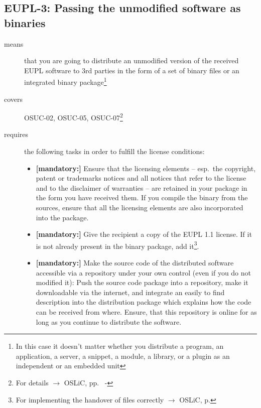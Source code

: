 \subsection{EUPL-3: Passing the unmodified software as binaries} 

\begin{description}
\item[means] that you are going to distribute an unmodified version of the
received EUPL software to 3rd parties in the form of a set of binary files or an
integrated bi\-na\-ry package\footnote{In this case it doesn't matter
whether you  distribute a program, an application, a server, a snippet, a
module, a library, or a plugin as an independent or an embedded unit}

\item[covers] OSUC-02, OSUC-05, OSUC-07\footnote{For details $\rightarrow$ OSLiC, pp.\
\pageref{OSUC-02-DEF} - \pageref{OSUC-07-DEF}}

\item[requires] the following tasks in order to fulfill the license conditions:
\begin{itemize}
  
  \item \textbf{[mandatory:]} Ensure that the licensing elements -- esp.\ the
  copyright, patent or trademarks notices and all notices that refer to the
  license and to the disclaimer of warranties -- are retained in your package in
  the form you have received them. If you compile the binary from the sources,
  ensure that all the licensing elements are also incorporated into the package.
  
  \item \textbf{[mandatory:]} Give the recipient a copy of the EUPL 1.1
  license. If it is not already present in the binary package, add
  it\footnote{For implementing the handover of files correctly $\rightarrow$
  OSLiC, p. \pageref{DistributingFilesHint}}.

  \item \textbf{[mandatory:]} Make the source code of the distributed software
  accessible via a repository under your own control (even if you do not
  modified it): Push the source code package into a repository, make it
  downloadable via the internet, and integrate an easily to find description
  into the distribution package which explains how the code can be received from
  where. Ensure, that this repository is online for as long as you continue to
  distribute the software.
  

\end{itemize}
\end{description}
